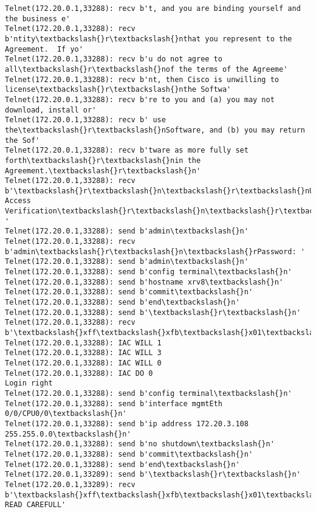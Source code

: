 \documentclass[11pt]{article}
\begin{document}
\begin{Verbatim}[commandchars=\\\{\}]
Telnet(172.20.0.1,33288): recv b't, and you are binding yourself and the business e'
Telnet(172.20.0.1,33288): recv b'ntity\textbackslash{}r\textbackslash{}nthat you represent to the Agreement.  If yo'
Telnet(172.20.0.1,33288): recv b'u do not agree to all\textbackslash{}r\textbackslash{}nof the terms of the Agreeme'
Telnet(172.20.0.1,33288): recv b'nt, then Cisco is unwilling to license\textbackslash{}r\textbackslash{}nthe Softwa'
Telnet(172.20.0.1,33288): recv b're to you and (a) you may not download, install or'
Telnet(172.20.0.1,33288): recv b' use the\textbackslash{}r\textbackslash{}nSoftware, and (b) you may return the Sof'
Telnet(172.20.0.1,33288): recv b'tware as more fully set forth\textbackslash{}r\textbackslash{}nin the Agreement.\textbackslash{}r\textbackslash{}n'
Telnet(172.20.0.1,33288): recv b'\textbackslash{}r\textbackslash{}n\textbackslash{}r\textbackslash{}nUser Access Verification\textbackslash{}r\textbackslash{}n\textbackslash{}r\textbackslash{}nUsername: '
Telnet(172.20.0.1,33288): send b'admin\textbackslash{}n'
Telnet(172.20.0.1,33288): recv b'admin\textbackslash{}r\textbackslash{}n\textbackslash{}rPassword: '
Telnet(172.20.0.1,33288): send b'admin\textbackslash{}n'
Telnet(172.20.0.1,33288): send b'config terminal\textbackslash{}n'
Telnet(172.20.0.1,33288): send b'hostname xrv8\textbackslash{}n'
Telnet(172.20.0.1,33288): send b'commit\textbackslash{}n'
Telnet(172.20.0.1,33288): send b'end\textbackslash{}n'
Telnet(172.20.0.1,33288): send b'\textbackslash{}r\textbackslash{}n'
Telnet(172.20.0.1,33288): recv b'\textbackslash{}xff\textbackslash{}xfb\textbackslash{}x01\textbackslash{}xff\textbackslash{}xfb\textbackslash{}x03\textbackslash{}xff\textbackslash{}xfb\textbackslash{}x00\textbackslash{}xff\textbackslash{}xfd\textbackslash{}x00\textbackslash{}x1b]0;xrv8\textbackslash{}x07\textbackslash{}r\textbackslash{}n\textbackslash{}rRP/0/0/CPU0:xrv8\#\textbackslash{}r\textbackslash{}n\textbackslash{}rRP/0/0'
Telnet(172.20.0.1,33288): IAC WILL 1
Telnet(172.20.0.1,33288): IAC WILL 3
Telnet(172.20.0.1,33288): IAC WILL 0
Telnet(172.20.0.1,33288): IAC DO 0
Login right
Telnet(172.20.0.1,33288): send b'config terminal\textbackslash{}n'
Telnet(172.20.0.1,33288): send b'interface mgmtEth 0/0/CPU0/0\textbackslash{}n'
Telnet(172.20.0.1,33288): send b'ip address 172.20.3.108 255.255.0.0\textbackslash{}n'
Telnet(172.20.0.1,33288): send b'no shutdown\textbackslash{}n'
Telnet(172.20.0.1,33288): send b'commit\textbackslash{}n'
Telnet(172.20.0.1,33288): send b'end\textbackslash{}n'
Telnet(172.20.0.1,33289): send b'\textbackslash{}r\textbackslash{}n'
Telnet(172.20.0.1,33289): recv b'\textbackslash{}xff\textbackslash{}xfb\textbackslash{}x01\textbackslash{}xff\textbackslash{}xfb\textbackslash{}x03\textbackslash{}xff\textbackslash{}xfb\textbackslash{}x00\textbackslash{}xff\textbackslash{}xfd\textbackslash{}x00\textbackslash{}x1b]0;xrv9\textbackslash{}x07\textbackslash{}r\textbackslash{}n\textbackslash{}r\textbackslash{}nIMPORTANT:  READ CAREFULL'

\end{Verbatim}
\end{document}
